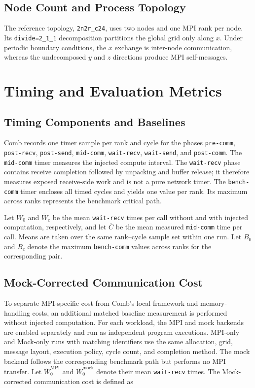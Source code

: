 \subsection{Node Count and Process Topology}

The reference topology, \texttt{2n2r\_c24}, uses two nodes and one MPI rank per
node. Its \texttt{divide=2\_1\_1} decomposition partitions the global grid
only along $x$. Under periodic boundary conditions, the $x$ exchange is
inter-node communication, whereas the undecomposed $y$ and $z$ directions
produce MPI self-messages.

\section{Timing and Evaluation Metrics}\label{sec:timing-metrics}

\subsection{Timing Components and Baselines}

Comb records one timer sample per rank and cycle for the phases
\texttt{pre-comm}, \texttt{post-recv}, \texttt{post-send},
\texttt{mid-comm}, \texttt{wait-recv}, \texttt{wait-send}, and
\texttt{post-comm}. The \texttt{mid-comm} timer measures the injected compute
interval. The \texttt{wait-recv} phase contains receive completion followed by
unpacking and buffer release; it therefore measures exposed receive-side work
and is not a pure network timer. The \texttt{bench-comm} timer encloses all
timed cycles and yields one value per rank. Its maximum across ranks represents
the benchmark critical path.

Let $\bar{W}_0$ and $\bar{W}_c$ be the mean \texttt{wait-recv} times per call
without and with injected computation, respectively, and let $\bar{C}$ be the
mean measured \texttt{mid-comm} time per call. Means are taken over the same
rank--cycle sample set within one run. Let $B_0$ and $B_c$ denote the maximum
\texttt{bench-comm} values across ranks for the corresponding pair.

\subsection{Mock-Corrected Communication Cost}
\label{sec:mock-corrected-communication}

To separate MPI-specific cost from Comb's local framework and memory-handling
costs, an additional matched baseline measurement is performed without
injected computation. For each workload, the MPI and mock backends are enabled
separately and run as independent program executions. MPI-only and Mock-only
runs with matching identifiers use the same allocation, grid, message layout,
execution policy, cycle count, and completion method. The mock backend follows
the corresponding benchmark path but performs no MPI transfer. Let
$\bar{W}^{\mathrm{MPI}}_0$ and $\bar{W}^{\mathrm{mock}}_0$ denote their mean
\texttt{wait-recv} times. The Mock-corrected communication cost is defined as

